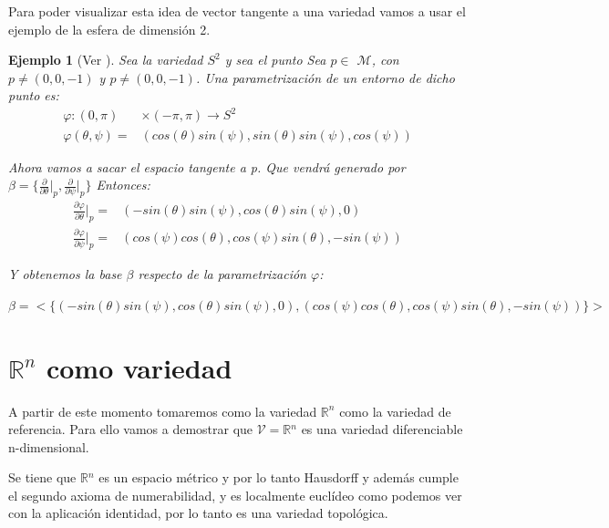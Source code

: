\documentclass[pdftex,11pt,a4paper]{book}
\newtheorem{ejem}{Ejemplo}
\newcommand{\bproof}{\bigskip {\bf Demostración. }}
\newcommand{\M}{$\mathscr{M}$}
\newcommand{\R}{$\mathbb{R}$}
\begin{document}
Para poder visualizar esta idea de vector tangente a una variedad vamos a usar el ejemplo de la esfera de dimensión 2. 

\begin{ejem}[Ver \cite{gondinho}]
Sea la variedad $S^2$  y sea el punto Sea $p \in$ \M , con $p \neq (0,0,-1)$ y $p \neq (0,0,-1)$. Una parametrización de un entorno de dicho punto es:
\begin{equation}
    \begin{aligned}
           \varphi:(0, \pi)&\times(-\pi,\pi)\rightarrow S^2 \\ 
           \varphi(\theta, \psi)=& (cos(\theta)sin(\psi), sin(\theta)sin(\psi), cos(\psi))
    \end{aligned}
\end{equation}

Ahora vamos a sacar el espacio tangente a p. Que vendrá generado por $\beta = \lbrace \frac{\partial}{\partial \theta}\bigg|_{p},\frac{\partial}{\partial \psi}\bigg|_{p} \rbrace$
Entonces: 
\begin{equation}
    \begin{aligned}
           \frac{\partial \varphi}{\partial \theta}\bigg|_{p}=& (-sin(\theta)sin(\psi),cos(\theta)sin(\psi),0)\\
	\frac{\partial \varphi}{\partial \psi}\bigg|_{p} =& (cos(\psi)cos(\theta),cos(\psi)sin(\theta),-sin(\psi))
    \end{aligned}
\end{equation}

Y obtenemos la base $\beta$ respecto de la parametrización $\varphi$: 
\begin{center}
	$\beta= <\lbrace (-sin(\theta)sin(\psi),cos(\theta)sin(\psi),0) , (cos(\psi)cos(\theta),cos(\psi)sin(\theta),-sin(\psi))\rbrace>$
\end{center}

\end{ejem}




\section{$\mathbb{R}^n$ como variedad}
A partir de este momento tomaremos como la variedad $\mathds{R}^n$ como la variedad de referencia. Para ello vamos a demostrar que $\mathscr{V}=$\R$^n$ es una variedad diferenciable n-dimensional.

\bproof
Se tiene que \R$^n$ es un espacio métrico y por lo tanto Hausdorff y además cumple el segundo axioma de numerabilidad, y es localmente euclídeo como podemos ver con la aplicación identidad, por lo tanto es una variedad topológica.
 
\end{document}
